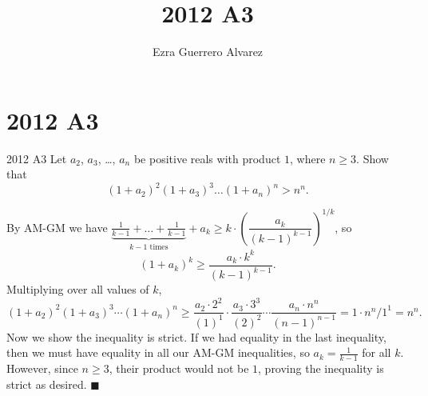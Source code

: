 \documentclass[14pt]{article}
\title{2012 A3}
\author{Ezra Guerrero Alvarez}
\begin{document}
\maketitle
	
\section*{2012 A3}

\begin{statement}{2012 A3}
	Let $a_2$, $a_3$, \dots, $a_n$ be positive reals with product $1$,
	where $n \ge 3$.
	Show that
	\[ (1+a_2)^2 (1+a_3)^3 \dots (1+a_n)^n > n^n. \]
\end{statement}
By AM-GM we have $\underbrace{\frac1{k-1}+\ldots+\frac1{k-1}}_{k-1\text{ times}}+a_k\ge k\cdot\left(\dfrac{a_k}{(k-1)^{k-1}}\right)^{1/k}$, so 
\[ (1+a_k)^k \ge \frac{a_k\cdot k^k }{(k-1)^{k-1}}. \]
Multiplying over all values of $k$, 
\[ (1+a_2)^2(1+a_3)^3\cdots(1+a_n)^n \ge \frac{a_2\cdot 2^2 }{(1)^{1}}\cdot\frac{a_3\cdot 3^3 }{(2)^{2}}\cdots\frac{a_n\cdot n^n }{(n-1)^{n-1}} = 1\cdot n^n/1^1 = n^n. \]
Now we show the inequality is strict. If we had equality in the last inequality, then we must have equality in all our AM-GM inequalities, so $a_k = \frac1{k-1}$ for all $k$. However, since $n\ge3$, their product would not be $1$, proving the inequality is strict as desired. $\blacksquare$
	
\end{document}
